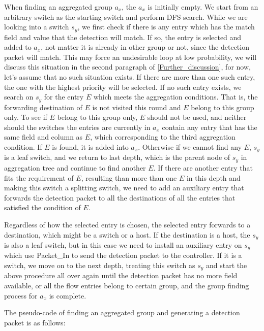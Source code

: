 When finding an aggregated group $a_x$, the $a_x$ is initially empty. We start from an arbitrary switch as the starting switch and perform DFS search. While we are looking into a switch $s_y$, we first check if there is any entry which has the match field and value that the detection will match. If so, the entry is selected and added to $a_x$, not matter it is already in other group or not, since the detection packet will match. This may force an undesirable loop at low probability, we will discuss this situation in the second paragraph of \ref{Further_discussion}, for now, let's assume that no such situation exists. If there are more than one such entry, the one with the highest priority will be selected. If no such entry exists, we search on $s_y$ for the entry $E$ which meets the aggregation conditions. That is, the forwarding destination of $E$ is not visited this round and $E$ belong to this group only. To see if $E$ belong to this group only, $E$ should not be used, and neither should the switches the entries are currently in $a_x$ contain any entry that has the same field and column as $E$, which corresponding to the third aggregation condition. If $E$ is found, it is added into $a_x$. Otherwise if we cannot find any $E$, $s_y$ is a leaf switch, and we return to last depth, which is the parent node of $s_y$ in aggregation tree and continue to find another $E$. If there are another entry that fits the requirement of $E$, resulting than more than one $E$ in this depth and making this switch a splitting switch, we need to add an auxiliary entry that forwards the detection packet to all the destinations of all the entries that satisfied the condition of $E$.

Regardless of how the selected entry is chosen, the selected entry forwards to a destination, which might be a switch or a host. If the destination is a host, the $s_y$ is also a leaf switch, but in this case we need to install an auxiliary entry on $s_y$ which use Packet\_In to send the detection packet to the controller. If it is a switch, we move on to the next depth, treating this switch as $s_y$ and start the above procedure all over again until the detection packet has no more field available, or all the flow entries belong to certain group, and the group finding process for $a_x$ is complete.

The pseudo-code of finding an aggregated group and generating a detection packet is as follows:

